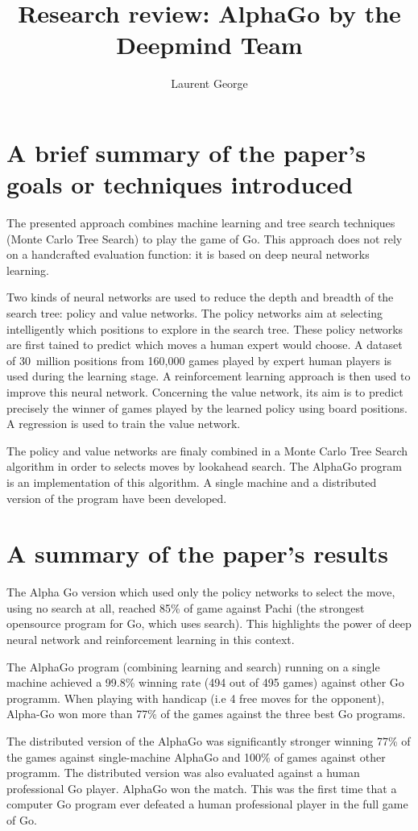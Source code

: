 \documentclass{article}
\author{Laurent George}
\title{Research review: AlphaGo by the Deepmind Team}
\begin{document}
\maketitle
\section{A brief summary of the paper's goals or techniques introduced}
The presented approach combines machine learning and tree search
techniques (Monte Carlo Tree Search) to play the game of Go. This approach does
not rely on a handcrafted evaluation function: it is based on deep neural
networks learning.

Two kinds of neural networks are used to reduce the depth and breadth of the
search tree: policy and value networks. 
The policy networks aim at selecting intelligently which positions to explore
in the search tree. These policy networks are first tained to predict which
moves a human expert would choose.
A dataset of 30~million positions from 160,000
games played by expert human players is used during the learning stage. A
reinforcement learning approach is then used to improve this neural network.
Concerning the value network, its aim is to predict precisely the winner of
games played by the learned policy using board positions. A regression is used
to train the value network.

The policy and value networks are finaly combined in a Monte
Carlo Tree Search algorithm in order to selects moves by lookahead search. The
AlphaGo program is an implementation of this algorithm. A single machine and a
distributed version of the program have been developed.

\section{A summary of the paper's results}
The Alpha Go version which used only the policy networks to select the move, using
no search at all, reached 85\% of game against Pachi (the strongest
opensource program for Go, which uses search). This highlights the power
of deep neural network and reinforcement learning in this context.

The AlphaGo program (combining learning and search) running on a single machine
achieved a 99.8\% winning rate (494 out of 495 games) against other Go programm.
When playing with handicap (i.e 4 free moves for the opponent), Alpha-Go won
more than 77\% of the games against the three best Go programs. 

The distributed version of the AlphaGo was significantly stronger winning 77\% of
 the games against single-machine AlphaGo and 100\% of games against other programm.
The distributed version was also evaluated against a human professional Go player.
AlphaGo won the match. This was the first time that a computer Go program ever
defeated a human professional player in the full game of Go.
\end{document}
